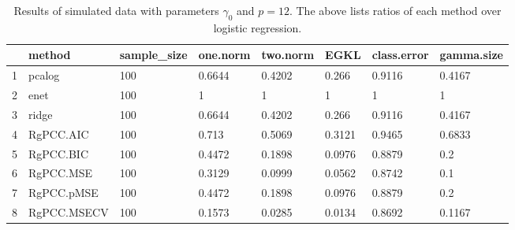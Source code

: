 \begin{table}[ht]
\centering
\begin{tabular}{rlllllll}
  \hline
 & method & sample\_size & one.norm & two.norm & EGKL & class.error & gamma.size \\ 
  \hline
1 & pcalog & 100 & 0.6644 & 0.4202 & 0.266 & 0.9116 & 0.4167 \\ 
  2 & enet & 100 & 1 & 1 & 1 & 1 & 1 \\ 
  3 & ridge & 100 & 0.6644 & 0.4202 & 0.266 & 0.9116 & 0.4167 \\ 
  4 & RgPCC.AIC & 100 & 0.713 & 0.5069 & 0.3121 & 0.9465 & 0.6833 \\ 
  5 & RgPCC.BIC & 100 & 0.4472 & 0.1898 & 0.0976 & 0.8879 & 0.2 \\ 
  6 & RgPCC.MSE & 100 & 0.3129 & 0.0999 & 0.0562 & 0.8742 & 0.1 \\ 
  7 & RgPCC.pMSE & 100 & 0.4472 & 0.1898 & 0.0976 & 0.8879 & 0.2 \\ 
  8 & RgPCC.MSECV & 100 & 0.1573 & 0.0285 & 0.0134 & 0.8692 & 0.1167 \\ 
   \hline
\end{tabular}
\caption{Results of simulated data with parameters $\gamma_0$ and $p =12$. The above lists ratios of each method over logistic regression.} 
\label{fig-0-debug-new-algo-12-metrics-pratio}
\end{table}
